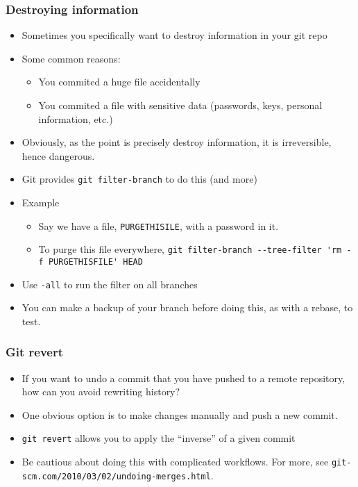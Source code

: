 \documentclass{beamer}
\begin{document}
\begin{frame}[fragile]
\frametitle{Destroying information}
\begin{itemize}
\item Sometimes you specifically want to destroy information in your git repo
\item Some common reasons:
\begin{itemize}
\item You commited a huge file accidentally
\item You commited a file with sensitive data (passwords, keys, personal information, etc.)
\end{itemize}
\item Obviously, as the point is precisely destroy information, it is irreversible, hence dangerous.
\item Git provides \lstinline{git filter-branch} to do this (and more)
\item Example
\begin{itemize}
  \item Say we have a file, \lstinline{PURGETHISILE}, with a password in it.
\item To purge this file everywhere, \lstinline{git filter-branch --tree-filter 'rm -f PURGETHISFILE' HEAD}
\end{itemize}
\item Use \texttt{-all} to run the filter on all branches
\item You can make a backup of your branch before doing this, as with a rebase, to test.
\end{itemize}
\end{frame}

\begin{frame}[fragile]
\frametitle{Git revert}
\begin{itemize}
\item If you want to undo a commit that you have pushed to a remote repository, how can you avoid rewriting history?
\item One obvious option is to make changes manually and push a new commit.
\item \lstinline{git revert} allows you to apply the ``inverse'' of a given commit
\item Be cautious about doing this with complicated workflows. For more, see \texttt{git-scm.com/2010/03/02/undoing-merges.html}.
\end{itemize}
\end{frame}
\end{document}
